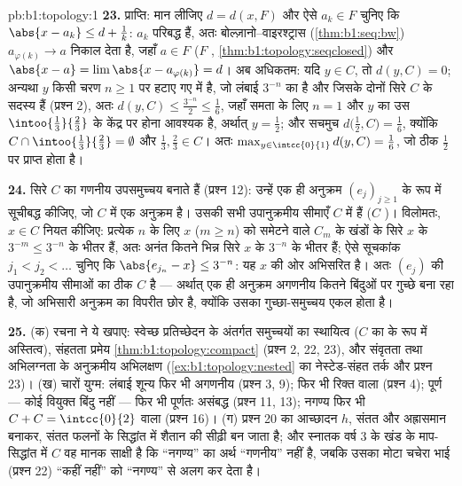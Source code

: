 \begin{solution}{pb:b1:topology:1}
\textbf{23.} प्राप्ति: मान लीजिए $d = d(x, F)$ और ऐसे $a_k \in F$ चुनिए कि
$\abs{x - a_k} \leq d + \frac1k$: $a_k$ परिबद्ध हैं, अतः
बोल्ज़ानो--वाइरश्ट्रास (\cref{thm:b1:seq:bw}) $a_{\varphi(k)} \to a$ निकाल
देता है, जहाँ $a \in F$ ($F$ , \cref{thm:b1:topology:seqclosed}) और
$\abs{x - a} = \lim \abs{x - a_{\varphi(k)}} = d$। अब अधिकतम: यदि $y \in C$,
तो $d(y, C) = 0$; अन्यथा $y$ किसी चरण $n \geq 1$ पर हटाए गए  में है,
जो लंबाई $3^{-n}$ का   है और जिसके दोनों सिरे $C$ के सदस्य हैं
(प्रश्न 2), अतः $d(y, C) \leq \frac{3^{-n}}{2} \leq \frac16$, जहाँ समता के
लिए $n = 1$ और $y$ का उस  $\intoo{\frac13}{\frac23}$ के केंद्र पर होना
आवश्यक है, अर्थात् $y = \frac12$; और सचमुच $d\bigl(\frac12, C\bigr) =
\frac16$, क्योंकि $C \cap \intoo{\frac13}{\frac23} = \emptyset$ और $\frac13,
\frac23 \in C$। अतः $\max_{y\in\intcc{0}{1}} d(y, C) = \frac16$, जो ठीक
$\frac12$ पर प्राप्त होता है।

\textbf{24.} सिरे $C$ का गणनीय  उपसमुच्चय बनाते हैं (प्रश्न 12): उन्हें
एक ही अनुक्रम $(e_j)_{j\geq1}$ के रूप में सूचीबद्ध कीजिए, जो $C$ में एक
अनुक्रम है। उसकी सभी उपानुक्रमीय सीमाएँ $C$ में हैं ($C$ )। विलोमतः, $x
\in C$ नियत कीजिए: प्रत्येक $n$ के लिए $x$ ($m \geq n$) को समेटने वाले $C_m$
के खंडों के सिरे $x$ के $3^{-m} \leq 3^{-n}$ के भीतर हैं, अतः अनंत कितने
भिन्न सिरे $x$ के $3^{-n}$ के भीतर हैं; ऐसे सूचकांक $j_1 < j_2 < \dots$
चुनिए कि $\abs{e_{j_n} - x} \leq 3^{-n}$: यह $x$ की ओर अभिसरित  है।
अतः $(e_j)$ की उपानुक्रमीय सीमाओं का  ठीक $C$ है --- अर्थात् एक ही
अनुक्रम अगणनीय कितने बिंदुओं पर गुच्छे बना रहा है, जो अभिसारी अनुक्रम का
विपरीत छोर है, क्योंकि उसका गुच्छा-समुच्चय एकल होता है।

\textbf{25.} (क) रचना ने ये खपाए: स्वेच्छ प्रतिच्छेदन के अंतर्गत 
समुच्चयों का स्थायित्व ($C$ का  के रूप में अस्तित्व), संहतता
प्रमेय \cref{thm:b1:topology:compact} (प्रश्न 2, 22, 23), और संवृतता तथा
अभिलग्नता के अनुक्रमीय अभिलक्षण (\cref{ex:b1:topology:nested} का
नेस्टेड-संहत तर्क और प्रश्न 23)। (ख) चारों युग्म: लंबाई शून्य फिर भी अगणनीय
(प्रश्न 3, 9);  फिर भी रिक्त  वाला (प्रश्न 4); पूर्ण --- कोई
वियुक्त बिंदु नहीं --- फिर भी पूर्णतः असंबद्ध (प्रश्न 11, 13); नगण्य फिर भी
$C + C = \intcc{0}{2}$ वाला (प्रश्न 16)। (ग) प्रश्न 20 का आच्छादन $h$, संतत
और अह्रासमान बनाकर, संतत फलनों के सिद्धांत में शैतान की सीढ़ी बन जाता है; और
स्नातक वर्ष 3 के खंड के माप-सिद्धांत में $C$ वह मानक साक्षी है कि ``नगण्य''
का अर्थ ``गणनीय'' नहीं है, जबकि उसका मोटा चचेरा भाई (प्रश्न 22) ``कहीं 
नहीं'' को ``नगण्य'' से अलग कर देता है।
\end{solution}
